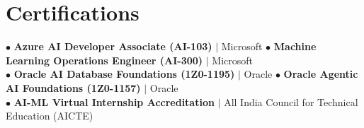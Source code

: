 \documentclass[letterpaper,10pt]{article}
\begin{document}
\section{Certifications}
\vspace{-2pt}
\begin{itemize}[leftmargin=0.15in, label={}, noitemsep, topsep=-3pt]
    \small{\item{
     $\bullet$ \textbf{Azure AI Developer Associate (AI-103)} $|$ Microsoft \hfill $\bullet$ \textbf{Machine Learning Operations Engineer (AI-300)} $|$ Microsoft \\
     $\bullet$ \textbf{Oracle AI Database Foundations (1Z0-1195)} $|$ Oracle \hfill $\bullet$ \textbf{Oracle Agentic AI Foundations (1Z0-1157)} $|$ Oracle \\
     $\bullet$ \textbf{AI-ML Virtual Internship Accreditation} $|$ All India Council for Technical Education (AICTE)
    }}
\end{itemize}
\vspace{-6pt}
\end{document}
